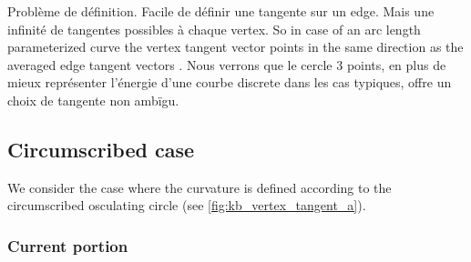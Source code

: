 Problème de définition. Facile de définir une tangente sur un edge. Mais une infinité de tangentes possibles à chaque vertex. So in case of an arc length parameterized curve the vertex tangent vector points in the same direction as the averaged edge tangent vectors \cite[p.12]{Hoffmann2008}. Nous verrons que le cercle 3 points, en plus de mieux représenter l'énergie d'une courbe discrete dans les cas typiques, offre un choix de tangente non ambïgu.

\subsection{Circumscribed case}

We consider the case where the curvature is defined according to the circumscribed osculating circle (see \cref{fig:kb_vertex_tangent_a}). 

\subsubsection{Current portion}

